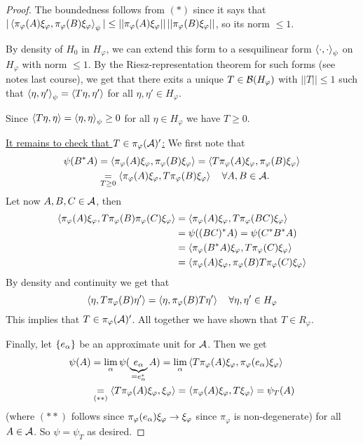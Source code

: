 \documentclass[10pt,english,a4paper]{article}
\theoremstyle{definition}
\def\pivp{\pi_{\vphi}}
\def\Hvp{H_{\vphi}}
\def\xivp{\xi_{\vphi}}
\def\vphi{\varphi}
\begin{document}
\begin{proof}
The boundedness follows from $(*)$ since it says that 
$|\ind{\pivp(A)\xivp, \pivp(B)\xivp}_{\psi}|\leq ||\pivp(A)\xivp||\, ||\pivp(B)\xivp||$,
so its norm $\leq 1$.

By density of $H_0$ in $\Hvp$, we can extend this form to a sesquilinear form 
$\left\langle \cdot,\cdot \right\rangle_{\psi}$ on $\Hvp$ with norm $\leq 1$. 
By the Riesz-representation theorem for such forms (see notes last course),
we get that there exits a unique $T\in \Bs(H_{\vphi})$ with $||T||\leq 1$ 
such that $\left\langle \eta,\eta' \right\rangle_{\psi} = \left\langle T\eta,\eta' \right\rangle$ for all $\eta,\eta' \in
\Hvp$.

Since $\left\langle T\eta,\eta \right\rangle= \left\langle \eta,\eta \right\rangle_{\psi} \geq 0$ for all $\eta \in \Hvp$
we have $T\geq 0$.

\ul{It remains to check that $T \in \pivp(\As)'$:}
We first note that 
\begin{align*}
\psi(B^*A) & = \ind{\pivp(A)\xivp, \pivp(B)\xivp} = 
\ind{T\pivp(A)\xivp, \pivp(B)\xivp} \\
&\underset{T\geq 0}{=} \ind{\pivp(A)\xivp, T\pivp(B)\xivp}\quad \forall A,B\in \As.
\end{align*}
Let now $A,B,C \in \mathcal{A}$,
then 
\begin{align*}
    \ind{\pivp(A)\xivp, T\pivp(B)\pivp(C)\xivp} &= \ind{\pivp(A)\xivp, T\pivp(BC)\xivp}\\
&= \psi((BC)^*A) = \psi(C^*B^*A) \\
&= \ind{\pivp(B^*A)\xivp, T\pivp(C)\xivp}\\ 
&= \ind{\pivp(A)\xivp, \pivp(B)T\pivp(C)\xivp} 
\end{align*}
By density and continuity we get that 
\[ \ind{\eta, T\pivp(B)\eta'} = \ind{\eta,\pivp(B)T\eta'}\quad\forall \eta,\eta' \in \Hvp \]
This implies that $T \in \pivp(\As)'$.
All together we have shown that $T \in R_{\vphi}$.

Finally, let $\{e_{\alpha}\}$ be an approximate unit for $\mathcal{A}$. 
Then we get 
\begin{align*}
\psi(A) &= \lim_{\al} \psi(\ub{e_{\al}}_{=e_{\al}^{*}}A)
= \lim_{\al}\ind{T\pivp(A)\xivp, \pivp(e_{\al})\xivp} \\
&\underset{(**)}{=}
\ind{T\pivp(A)\xivp, \xivp} = \ind{\pivp(A)\xivp, T\xivp} = \psi_{T}(A)
\end{align*}
(where $(**)$ follows since $\pivp(e_{\al})\xivp \to \xivp$ since $\pivp$ is non-degenerate)
for all $A\in \mathcal{A}$. So $\psi=\psi_T$ as desired.  

\end{proof}
\end{document}
